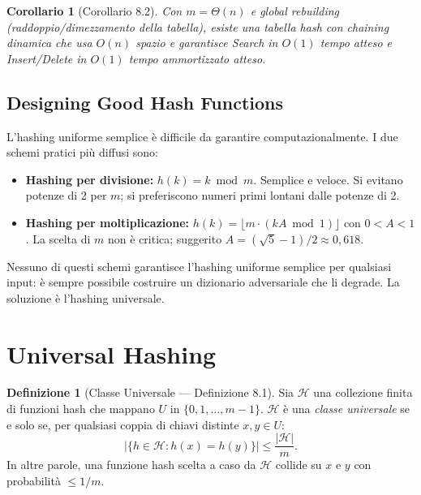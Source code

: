 \documentclass[12pt, a4paper, oneside]{book}
\theoremstyle{plain}
\newtheorem{corollario}[teorema]{Corollario}
\theoremstyle{definition}
\newtheorem{definizione}[teorema]{Definizione}
\theoremstyle{remark}
\begin{document}
\begin{corollario}[Corollario 8.2]
Con $m = \Theta(n)$ e global rebuilding (raddoppio/dimezzamento della tabella), esiste una tabella hash con chaining \emph{dinamica} che usa $O(n)$ spazio e garantisce Search in $O(1)$ tempo atteso e Insert/Delete in $O(1)$ tempo ammortizzato atteso.
\end{corollario}

\subsection{Designing Good Hash Functions}

L'hashing uniforme semplice è difficile da garantire computazionalmente. I due schemi pratici più diffusi sono:

\begin{itemize}
  \item \textbf{Hashing per divisione:} $h(k) = k \bmod m$. Semplice e veloce. Si evitano potenze di 2 per $m$; si preferiscono numeri primi lontani dalle potenze di 2.
  \item \textbf{Hashing per moltiplicazione:} $h(k) = \lfloor m \cdot (kA \bmod 1)\rfloor$ con $0 < A < 1$. La scelta di $m$ non è critica; suggerito $A = (\sqrt{5}-1)/2 \approx 0{,}618$.
\end{itemize}

Nessuno di questi schemi garantisce l'hashing uniforme semplice per qualsiasi input: è sempre possibile costruire un dizionario adversariale che li degrade. La soluzione è l'hashing universale.

\section{Universal Hashing}

\begin{definizione}[Classe Universale --- Definizione 8.1]
Sia $\mathcal{H}$ una collezione finita di funzioni hash che mappano $U$ in $\{0, 1, \ldots, m-1\}$. $\mathcal{H}$ è una \emph{classe universale} se e solo se, per qualsiasi coppia di chiavi distinte $x, y \in U$:
\[
\left|\{h \in \mathcal{H} : h(x) = h(y)\}\right| \le \frac{|\mathcal{H}|}{m}.
\]
In altre parole, una funzione hash scelta a caso da $\mathcal{H}$ collide su $x$ e $y$ con probabilità $\le 1/m$.
\end{definizione}
\end{document}
